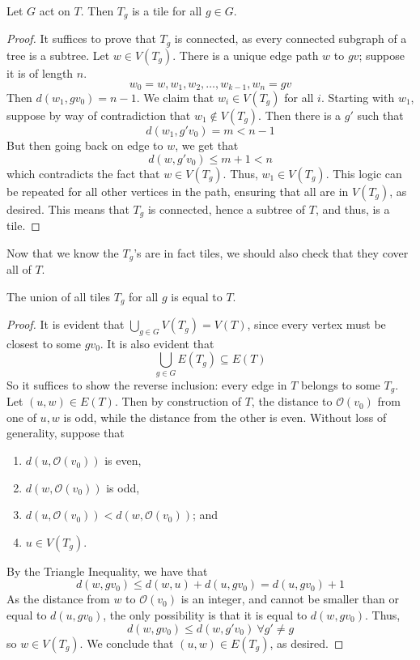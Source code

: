 \begin{lemma}\label{Tg is a Tile}
    Let $G$ act on $T$. Then $T_g$ is a tile for all $g \in G$.
\end{lemma}

\begin{proof}
    It suffices to prove that $T_g$ is connected, as every connected subgraph of a tree is a subtree. Let $w \in V(T_g)$. There is a unique edge path $w$ to $gv$; suppose it is of length $n$.
    \[
    w_0 = w, w_1, w_2, \ldots, w_{k-1}, w_n = gv
    \]
    Then $d(w_1,gv_0) = n-1$. We claim that $w_i \in V(T_g)$ for all $i$. Starting with $w_1$, suppose by way of contradiction that $w_1 \notin V(T_g)$. Then there is a $g'$ such that 
    \[
    d(w_1,g'v_0) = m < n-1
    \]
    But then going back on edge to $w$, we get that 
    \[
    d(w,g'v_0) \leq m+1 < n
    \]
    which contradicts the fact that $w \in V(T_g)$. Thus, $w_1 \in V(T_g)$. This logic can be repeated for all other vertices in the path, ensuring that all are in $V(T_g)$, as desired. This means that $T_g$ is connected, hence a subtree of $T$, and thus, is a tile. 
\end{proof}

Now that we know the $T_g$'s are in fact tiles, we should also check that they cover all of $T$. 

\begin{lemma}\label{T_g's cover T}
    The union of all tiles $T_g$ for all $g$ is equal to $T$. 
\end{lemma}

\begin{proof}
    It is evident that $\bigcup_{g\in G}V(T_g) = V(T)$, since every vertex must be closest to some $gv_0$. It is also evident that
        \[
            \bigcup_{g \in G}E(T_g) \subseteq E(T)
        \]
    So it suffices to show the reverse inclusion: every edge in $T$ belongs to some $T_g$. Let $(u,w) \in E(T)$. Then by construction of $T$, the distance to $\mathcal{O}(v_0)$ from one of $u,w$ is odd, while the distance from the other is even. Without loss of generality, suppose that
    \begin{enumerate}
        \item $d(u,\mathcal{O}(v_0))$ is even, 
        \item $d(w,\mathcal{O}(v_0))$ is odd,
        \item $d(u,\mathcal{O}(v_0)) < d(w,\mathcal{O}(v_0))$; and
        \item $u \in V(T_g)$.
    \end{enumerate}
     By the Triangle Inequality, we have that 
        \[
            d(w,gv_0) \leq d(w,u) +  d(u,gv_0) = d(u,gv_0) + 1
        \]
    As the distance from $w$ to $\mathcal{O}(v_0)$ is an integer, and cannot be smaller than or equal to $d(u,gv_0)$, the only possibility is that it is equal to $d(w,gv_0)$. Thus, 
    \[ d(w,gv_0) \leq d(w,g'v_0) \ \forall g' \neq g \]
    so $w \in V(T_g)$. We conclude that $(u,w) \in E(T_g)$, as desired. 
\end{proof}

